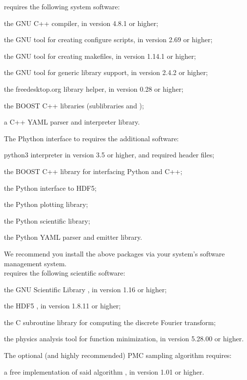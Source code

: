 \EOS requires the following system software:
\begin{description}[labelwidth=.15\textwidth]
    \item[\package{g++}] the GNU C++ compiler, in version 4.8.1 or higher;
    \item[\package{autoconf}] the GNU tool for creating configure scripts, in version 2.69 or higher;
    \item[\package{automake}] the GNU tool for creating makefiles, in version 1.14.1 or higher;
    \item[\package{libtool}] the GNU tool for generic library support, in version 2.4.2 or higher;
    \item[\package{pkg-config}] the freedesktop.org library helper, in version 0.28 or higher;
    \item[\package{BOOST}] the BOOST C++ libraries (sublibraries  and
            );
    \item[\package{yaml-cpp}] a C++ YAML parser and interpreter library.
\end{description}
The Phython \cite{Python} interface to \EOS requires the additional software:
\begin{description}[labelwidth=.15\textwidth]
    \item[\package{python3}] python3 interpreter in version 3.5 or higher, and required header files;
    \item[\package{BOOST}] the BOOST C++ library  for interfacing Python and C++;
    \item[\package{h5py}] the Python interface to HDF5;
    \item[\package{matplotlib}] the Python plotting library;
    \item[\package{scipy}] the Python scientific library;
    \item[\package{PyYAML}] the Python YAML parser and emitter library.
\end{description}
We recommend you install the above packages via your system's software management system.\\


\EOS requires the following scientific software:
\begin{description}[labelwidth=.15\textwidth]
    \item[\package{GSL}] the GNU Scientific Library \cite{GSL}, in version 1.16 or higher;
    \item[\package{HDF5}] the \gls{HDF5} \cite{HDF5}, in version 1.8.11 or higher;
    \item[\package{FFTW3}] the C subroutine library for computing the discrete Fourier transform;
    \item[\package{Minuit2}] the physics analysis tool for function minimization, in version 5.28.00 or higher.
\end{description}
The optional (and highly recommended) \gls{PMC} sampling algorithm requires:
\begin{description}[labelwidth=.15\textwidth]
    \item[\package{pmclib}] a free implementation of said algorithm \cite{libpmc}, in version 1.01 or higher.
\end{description}

